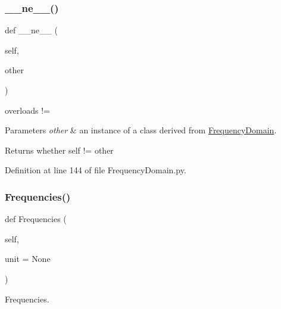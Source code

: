\subsubsection{\texorpdfstring{\+\_\+\+\_\+ne\+\_\+\+\_\+()}{\_\_ne\_\_()}}
{\footnotesize\ttfamily def \+\_\+\+\_\+ne\+\_\+\+\_\+ (\begin{DoxyParamCaption}\item[{}]{self,  }\item[{}]{other }\end{DoxyParamCaption})}



overloads != 


\begin{DoxyParams}{Parameters}
{\em other} & an instance of a class derived from \hyperlink{classSignalIntegrity_1_1FrequencyDomain_1_1FrequencyDomain_1_1FrequencyDomain}{Frequency\+Domain}. \\
\hline
\end{DoxyParams}
\begin{DoxyReturn}{Returns}
whether self != other 
\end{DoxyReturn}


Definition at line 144 of file Frequency\+Domain.\+py.

\mbox{\label{classSignalIntegrity_1_1FrequencyDomain_1_1FrequencyDomain_1_1FrequencyDomain_a227f355ed05bff8c1061e26a8a53758a}} 
\subsubsection{\texorpdfstring{Frequencies()}{Frequencies()}}
{\footnotesize\ttfamily def Frequencies (\begin{DoxyParamCaption}\item[{}]{self,  }\item[{}]{unit = {\ttfamily None} }\end{DoxyParamCaption})}



Frequencies. 


